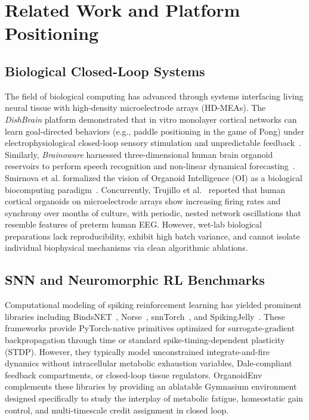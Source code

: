 \documentclass[journal]{IEEEtran}
\begin{document}
\section{Related Work and Platform Positioning}
\label{sec:related_work}

\subsection{Biological Closed-Loop Systems}
The field of biological computing has advanced through systems interfacing living neural tissue with high-density microelectrode arrays (HD-MEAs). The \emph{DishBrain} platform demonstrated that in vitro monolayer cortical networks can learn goal-directed behaviors (e.g., paddle positioning in the game of Pong) under electrophysiological closed-loop sensory stimulation and unpredictable feedback~\cite{Kagan2022DishBrain}. Similarly, \emph{Brainoware} harnessed three-dimensional human brain organoid reservoirs to perform speech recognition and non-linear dynamical forecasting~\cite{Cai2023Brainoware}. Smirnova et al. formalized the vision of Organoid Intelligence (OI) as a biological biocomputing paradigm~\cite{Smirnova2023OI}. Concurrently, Trujillo et al.~\cite{Trujillo2019CellStemCell} reported that human cortical organoids on microelectrode arrays show increasing firing rates and synchrony over months of culture, with periodic, nested network oscillations that resemble features of preterm human EEG. However, wet-lab biological preparations lack reproducibility, exhibit high batch variance, and cannot isolate individual biophysical mechanisms via clean algorithmic ablations.

\subsection{SNN and Neuromorphic RL Benchmarks}
Computational modeling of spiking reinforcement learning has yielded prominent libraries including BindsNET~\cite{Hazan2018BindsNET}, Norse~\cite{Pehle2021Norse}, snnTorch~\cite{Eshraghian2023snnTorch}, and SpikingJelly~\cite{Fang2023SpikingJelly}. These frameworks provide PyTorch-native primitives optimized for surrogate-gradient backpropagation through time or standard spike-timing-dependent plasticity (STDP). However, they typically model unconstrained integrate-and-fire dynamics without intracellular metabolic exhaustion variables, Dale-compliant feedback compartments, or closed-loop tissue regulators. OrganoidEnv complements these libraries by providing an ablatable Gymnasium environment designed specifically to study the interplay of metabolic fatigue, homeostatic gain control, and multi-timescale credit assignment in closed loop.
\end{document}
